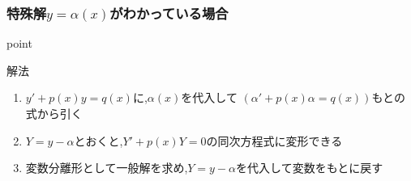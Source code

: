 \documentclass[a4paper]{jsarticle}
\begin{document}
\subsubsection{特殊解$y=\alpha\left(x\right)$がわかっている場合}
\begin{itembox}[l]{point}
    \begin{center}
    \end{center}
\end{itembox}
\begin{itembox}[l]{解法}
    \begin{enumerate}[(1)]
        \item $y'+p\left(x\right)y=q\left(x\right)$に,$\alpha\left(x\right)$を代入して
              $\left(\alpha'+p\left(x\right)\alpha=q\left(x\right)\right)$もとの式から引く
        \item $Y=y-\alpha$とおくと,$Y'+p\left(x\right)Y=0$の同次方程式に変形できる
        \item 変数分離形として一般解を求め,$Y=y-\alpha$を代入して変数をもとに戻す
    \end{enumerate}
\end{itembox}
\end{document}

